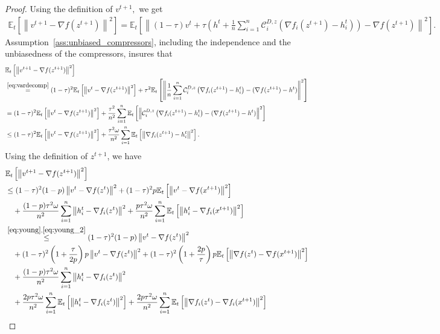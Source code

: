 \documentclass{article} %
\newcommand{\norm}[1]{\left\| #1 \right\|}
\newcommand{\ExpSub}[2]{{\mathbb{E}}_{#1}\left[#2\right]}
\newcommand{\cC}{\mathcal{C}}
\theoremstyle{plain}
\theoremstyle{definition}
\theoremstyle{remark}
\begin{document}
\begin{proof}
Using the definition of $v^{t+1},$ we get
\begin{align*}
  \ExpSub{t}{\norm{v^{t+1} - \nabla f(z^{t+1})}^2} = \ExpSub{t}{\norm{(1 - \tau) v^{t} + \tau\left(h^t + \frac{1}{n} \sum_{i=1}^n \cC_i^{D, z}\left(\nabla f_i(z^{t+1}) - h^t_i\right)\right) - \nabla f(z^{t+1})}^2}.
\end{align*}
Assumption~\ref{ass:unbiased_compressors}, including the independence and the unbiasedness of the compressors, insures that
\begin{align*}
  &\ExpSub{t}{\norm{v^{t+1} - \nabla f(z^{t+1})}^2} \\
  &\overset{\eqref{eq:vardecomp}}{=}(1 - \tau)^2 \ExpSub{t}{\norm{v^{t} - \nabla f(z^{t+1})}^2} + \tau^2\ExpSub{t}{\norm{\frac{1}{n} \sum_{i=1}^n \cC_i^{D, z}\left(\nabla f_i(z^{t+1}) - h^t_i\right) - (\nabla f(z^{t+1}) - h^t)}^2} \\
  &= (1 - \tau)^2 \ExpSub{t}{\norm{v^{t} - \nabla f(z^{t+1})}^2} + \frac{\tau^2}{n^2} \sum_{i=1}^n \ExpSub{t}{\norm{\cC_i^{D, z}\left(\nabla f_i(z^{t+1}) - h^t_i\right) - (\nabla f(z^{t+1}) - h^t)}^2} \\
  &\leq (1 - \tau)^2 \ExpSub{t}{\norm{v^{t} - \nabla f(z^{t+1})}^2} + \frac{\tau^2 \omega}{n^2} \sum_{i=1}^n \ExpSub{t}{\norm{\nabla f_i(z^{t+1}) - h^t_i}^2}.
\end{align*}
Using the definition of $z^{t+1}$, we have
\begin{align*}
  &\ExpSub{t}{\norm{v^{t+1} - \nabla f(z^{t+1})}^2} \\
  &\leq (1 - \tau)^2 (1 - p) \norm{v^{t} - \nabla f(z^{t})}^2 + (1 - \tau)^2 p \ExpSub{t}{\norm{v^{t} - \nabla f(x^{t+1})}^2} \\
  &\quad + \frac{(1 - p) \tau^2 \omega}{n^2} \sum_{i=1}^n \norm{h^t_i - \nabla f_i(z^{t})}^2 + \frac{p \tau^2 \omega}{n^2} \sum_{i=1}^n \ExpSub{t}{\norm{h^t_i - \nabla f_i(x^{t+1})}^2} \\
  &\overset{\eqref{eq:young}, \eqref{eq:young_2}}{\leq} (1 - \tau)^2 (1 - p) \norm{v^{t} - \nabla f(z^{t})}^2 \\
  &\quad + (1 - \tau)^2 \left(1 + \frac{\tau}{2 p}\right) p \norm{v^{t} - \nabla f(z^{t})}^2 + (1 - \tau)^2 \left(1 + \frac{2 p}{\tau}\right) p \ExpSub{t}{\norm{\nabla f(z^{t}) - \nabla f(x^{t+1})}^2} \\
  &\quad + \frac{(1 - p) \tau^2 \omega}{n^2} \sum_{i=1}^n \norm{h^t_i - \nabla f_i(z^{t})}^2 \\
  &\quad + \frac{2 p \tau^2 \omega}{n^2} \sum_{i=1}^n \ExpSub{t}{\norm{h^t_i - \nabla f_i(z^t)}^2} + \frac{2 p \tau^2 \omega}{n^2} \sum_{i=1}^n \ExpSub{t}{\norm{\nabla f_i(z^t) - \nabla f_i(x^{t+1})}^2} \\

\end{align*}
\end{proof}
\end{document}
